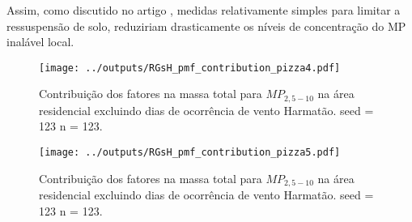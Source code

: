 Assim, como discutido no artigo \citet{zhou2013}, medidas relativamente simples 
para limitar a ressuspensão de solo, 
reduziriam drasticamente os níveis de concentração do MP inalável local.



\begin{landscape}
  \begin{figure}
    \centering
    \begin{minipage}[b]{0.45\linewidth}
      \texttt{[image: ../outputs/RGsH\_pmf\_contribution\_pizza4.pdf]}
      \caption{Contribuição dos fatores na massa total para $MP_{2,5-10}$ na área
               residencial excluindo dias de ocorrência de vento Harmatão. seed = 123 n = 123.
               \label{fig:RGsH_contribution4}}
    \end{minipage}%
    \hspace{0.5cm}
    \begin{minipage}[b]{0.45\linewidth}
      
    \end{minipage}
  \end{figure}
\end{landscape}

\begin{landscape}
  \begin{figure}
    \centering
    \begin{minipage}[b]{0.45\linewidth}
      \texttt{[image: ../outputs/RGsH\_pmf\_contribution\_pizza5.pdf]}
      \caption{Contribuição dos fatores na massa total para $MP_{2,5-10}$ na área
               residencial excluindo dias de ocorrência de vento Harmatão. seed = 123 n = 123.
               \label{fig:RGsH_contribution5}}
    \end{minipage}%
    \hspace{0.5cm}
    \begin{minipage}[b]{0.45\linewidth}
      
    \end{minipage}
  \end{figure}
\end{landscape}

